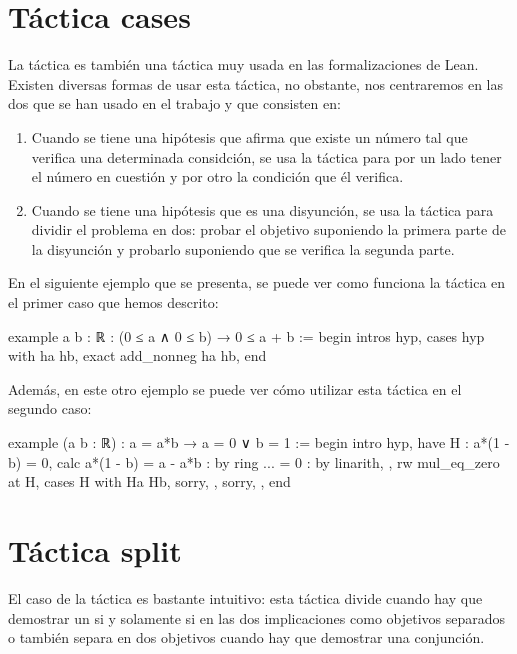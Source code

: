 \section{Táctica cases}
La táctica  es también una táctica muy usada en las
formalizaciones de Lean. Existen diversas formas de usar esta táctica, no
obstante, nos centraremos en las dos que se han usado en el trabajo y que
consisten en:
\begin{enumerate}
\item Cuando se tiene una hipótesis que afirma que existe un número tal que
  verifica una determinada considción, se usa la táctica 
  para por un lado tener el número en cuestión y por otro la condición que él
  verifica.

\item Cuando se tiene una hipótesis que es una disyunción, se usa la táctica
   para dividir el problema en dos: probar el objetivo
  suponiendo la primera parte de la disyunción y probarlo suponiendo que
  se verifica la segunda parte.
\end{enumerate}

En el siguiente ejemplo que se presenta, se puede ver como funciona la táctica
en el primer caso que hemos descrito:

\begin{leancode}
example {a b : ℝ} : (0 ≤ a ∧ 0 ≤ b) → 0 ≤ a + b :=
begin
  intros hyp,
  cases hyp with ha hb,
  exact add_nonneg ha hb,
end
\end{leancode}

Además, en este otro ejemplo se puede ver cómo utilizar esta táctica en el
segundo caso:

\begin{leancode}
example (a b : ℝ) : a = a*b → a = 0 ∨ b = 1 :=
begin
  intro hyp,
  have H : a*(1 - b) = 0,
  { calc a*(1 - b) = a - a*b : by ring
               ... = 0       : by linarith, },
  rw mul_eq_zero at H,
  cases H with Ha Hb,
  { sorry, },
  { sorry, },
end
\end{leancode}



\section{Táctica split}
El caso de la táctica  es bastante intuitivo: esta táctica
divide cuando hay que demostrar un si y solamente si en las dos implicaciones
como objetivos separados o también separa en dos objetivos cuando hay que
demostrar una conjunción.

